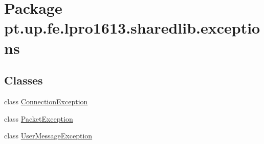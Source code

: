 \hypertarget{namespacept_1_1up_1_1fe_1_1lpro1613_1_1sharedlib_1_1exceptions}{}\section{Package pt.\+up.\+fe.\+lpro1613.\+sharedlib.\+exceptions}
\label{namespacept_1_1up_1_1fe_1_1lpro1613_1_1sharedlib_1_1exceptions}
\subsection*{Classes}
\begin{DoxyCompactItemize}
\item 
class \hyperlink{classpt_1_1up_1_1fe_1_1lpro1613_1_1sharedlib_1_1exceptions_1_1_connection_exception}{Connection\+Exception}
\item 
class \hyperlink{classpt_1_1up_1_1fe_1_1lpro1613_1_1sharedlib_1_1exceptions_1_1_packet_exception}{Packet\+Exception}
\item 
class \hyperlink{classpt_1_1up_1_1fe_1_1lpro1613_1_1sharedlib_1_1exceptions_1_1_user_message_exception}{User\+Message\+Exception}
\end{DoxyCompactItemize}
